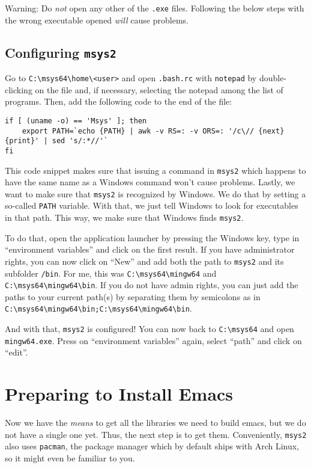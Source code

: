 \documentclass[a4paper, fontsize=11pt, headings=optiontohead, headsepline=true, twoside=false]{scrartcl}
\begin{document}
Warning: Do \emph{not} open any other of the \texttt{.exe} files. Following the below
steps with the wrong executable opened \emph{will} cause problems.
\subsection{Configuring \texttt{msys2}}
\label{sec:orgda15783}
Go to \texttt{C:\textbackslash{}msys64\textbackslash{}home\textbackslash{}<user>} and open \texttt{.bash.rc} with \texttt{notepad} by
   double-clicking on the file and, if necessary, selecting the
   notepad among the list of programs. Then, add the following code to
   the end of the file: 
\lstset{language=bash,label= ,caption= ,captionpos=b,numbers=none}
\begin{lstlisting}
if [ (uname -o) == 'Msys' ]; then
	export PATH=`echo {PATH} | awk -v RS=: -v ORS=: '/c\// {next} {print}' | sed 's/:*//'`
fi
\end{lstlisting}
This code snippet makes sure that issuing a command in \texttt{msys2} which
happens to have the same name as a Windows command won't cause
problems. Lastly, we want to make sure that \texttt{msys2} is recognized by
Windows. We do that by setting a so-called \texttt{PATH} variable. With that,
we just tell Windows to look for executables in that path. This way,
we make sure that Windows finds \texttt{msys2}.

To do that, open the application launcher by pressing the Windows key,
type in ``environment variables'' and click on the first result. If you
have administrator rights, you can now click on ``New'' and add both the
path to \texttt{msys2} and its subfolder \texttt{/bin}. For me, this was
\texttt{C:\textbackslash{}msys64\textbackslash{}mingw64} and \texttt{C:\textbackslash{}msys64\textbackslash{}mingw64\textbackslash{}bin}. If you do not have admin
rights, you can just add the paths to your current path(s) by
separating them by semicolons as in \texttt{C:\textbackslash{}msys64\textbackslash{}mingw64\textbackslash{}bin;C:\textbackslash{}msys64\textbackslash{}mingw64\textbackslash{}bin}.

And with that, \texttt{msys2} is configured! You can now back to \texttt{C:\textbackslash{}msys64} and
open \texttt{mingw64.exe}. Press on ``environment variables'' again, select
``path'' and click on ``edit''. 

\section{Preparing to Install Emacs}
\label{sec:org46ad6c4}
Now we have the \emph{means} to get all the libraries we need to build emacs, but
we do not have a single one yet. Thus, the next step is to get them. Conveniently, \texttt{msys2} also uses \texttt{pacman}, the package manager which
by default ships with Arch Linux, so it might even be familiar to you. 
\end{document}
